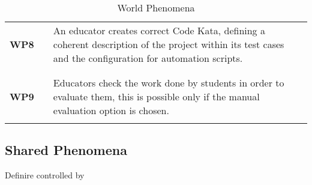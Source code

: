 \begin{table}[H]
\begin{tabular}{l l p{12cm}}
        \textbf{WP8} & \vline & An educator creates correct Code Kata, defining a coherent description of the project within its test cases and the configuration for automation scripts.       \\
                     &        &                                                                                                                                                                 \\\hline & & \\
        \textbf{WP9} & \vline & Educators check the work done by students in order to evaluate them, this is possible only if the manual evaluation option is chosen.                           \\
                     &        &                                                                                                                                                                 \\
        \hline
    \end{tabular}
    \caption{World Phenomena}
\end{table}

\newpage

\subsection{Shared Phenomena}

{\color{red} Definire controlled by} \\

